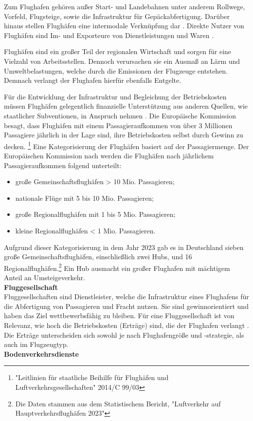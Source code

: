Zum Flughafen gehören außer Start- und Landebahnen unter anderem 
Rollwege, Vorfeld, Flugsteige, sowie die Infrastruktur für Gepäckabfertigung. 
Darüber hinaus stellen Flughäfen eine intermodale Verknüpfung dar \cite{conrady2019luftverkehr}. %
Direkte Nutzer von Flughäfen sind Im- und Exporteure von Dienstleistungen und Waren \cite{schaar2010analysis}. 

Flughäfen sind ein großer Teil der regionalen Wirtschaft \cite{schaar2010analysis} 
und sorgen für eine Vielzahl von Arbeitsstellen. 
Dennoch verursachen sie ein Ausmaß an Lärm und Umweltbelastungen, 
welche durch die Emissionen der Flugzeuge entstehen.
Demnach verlangt der Flughafen hierfür ebenfalls Entgelte. %

Für die Entwicklung der Infrastruktur und Begleichung der Betriebskosten müssen Flughäfen 
gelegentlich finanzielle Unterstützung aus anderen Quellen, wie staatlicher Subventionen, 
in Anspruch nehmen \cite{schaar2010analysis}.
Die Europäische Kommission besagt, dass Flughäfen mit einem Passagieraufkommen von über 3 Millionen 
Passagiere jährlich in der Lage sind, ihre Betriebskosten selbst durch Gewinn zu decken.
\footnote{"Leitlinien für staatliche Beihilfe für Flughäfen und Luftverkehrsgesellschaften" 2014/C 99/03}
Eine Kategorisierung der Flughäfen basiert auf der Passagiermenge. 
Der Europäischen Kommission nach werden die Flughäfen nach jährlichem Passagieraufkommen folgend unterteilt: 
\begin{itemize}
    \item große Gemeinschaftsflughäfen > 10 Mio. Passagieren;
    \item nationale Flüge mit 5 bis 10 Mio. Passagieren;
    \item große Regionalflughäfen mit 1 bis 5 Mio. Passagieren;
    \item kleine Regionalflughäfen < 1 Mio. Passagieren.
\end{itemize}
Aufgrund dieser Kategorisierung in dem Jahr 2023 gab es in Deutschland 
sieben große Gemeinschaftsflughäfen, einschließlich zwei Hubs, und 16 Regionalflughäfen.\footnote{Die Daten stammen aus dem Statistischem Bericht, "Luftverkehr auf Hauptverkehrsflughäfen 2023"}
Ein Hub ausmacht ein großer Flughafen mit mächtigem Anteil an Umsteigeverkehr.\\

\textbf{Fluggesellschaft} \\
Fluggesellschaften sind Dienstleister, welche die Infrastruktur eines Flughafens für die 
Abfertigung von Passagieren und Fracht nutzen. 
Sie sind gewinnorientiert und haben das Ziel wettbewerbsfähig zu bleiben. 
Für eine Fluggesellschaft ist von Relevanz, wie hoch die Betriebskosten (Erträge)
sind, die der Flughafen verlangt \cite{schaar2010analysis}. 
Die Erträge unterscheiden sich sowohl je nach Flughafengröße und -strategie, als auch im Flugzeugtyp.\\
%
\textbf{Bodenverkehrsdienste}\\ %

